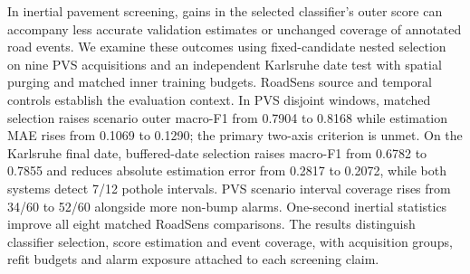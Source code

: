 In inertial pavement screening, gains in the selected classifier's outer score can accompany less accurate validation estimates or unchanged coverage of annotated road events. We examine these outcomes using fixed-candidate nested selection on nine PVS acquisitions and an independent Karlsruhe date test with spatial purging and matched inner training budgets. RoadSens source and temporal controls establish the evaluation context. In PVS disjoint windows, matched selection raises scenario outer macro-F1 from 0.7904 to 0.8168 while estimation MAE rises from 0.1069 to 0.1290; the primary two-axis criterion is unmet. On the Karlsruhe final date, buffered-date selection raises macro-F1 from 0.6782 to 0.7855 and reduces absolute estimation error from 0.2817 to 0.2072, while both systems detect 7/12 pothole intervals. PVS scenario interval coverage rises from 34/60 to 52/60 alongside more non-bump alarms. One-second inertial statistics improve all eight matched RoadSens comparisons. The results distinguish classifier selection, score estimation and event coverage, with acquisition groups, refit budgets and alarm exposure attached to each screening claim.
